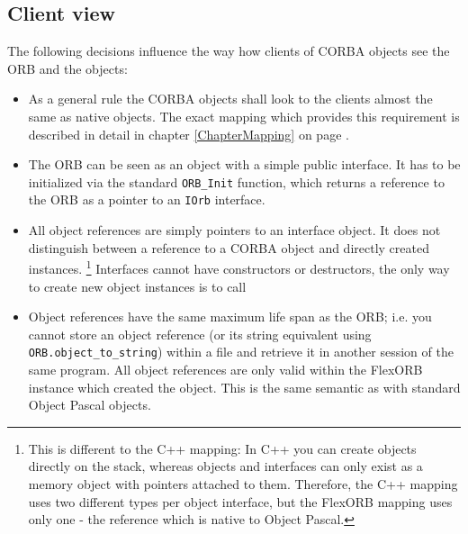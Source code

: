 \documentclass{report}
\begin{document}
\subsection{Client view}
The following decisions influence the way how clients of CORBA objects see the
ORB and the objects:
\begin{itemize}
\item As a general rule the CORBA objects shall look to the clients almost
      the same as native objects. The exact mapping which provides this
      requirement is described in detail in chapter \ref{ChapterMapping} on
      page \pageref{ChapterMapping}.
\item The ORB can be seen as an object with a simple public interface. It has to
      be initialized via the standard \texttt{ORB\_Init} function, which
      returns a reference to the ORB as a pointer to an \texttt{IOrb} interface.
\item All object references are simply pointers to an interface
      object. It does not distinguish between a reference to a CORBA object and
      directly created instances.
      \footnote{This is different to the C++ mapping: In C++ you can create
      objects directly on the stack, whereas \fpc objects and interfaces
      can only exist as a memory object with pointers attached to them.
      Therefore, the C++ mapping uses two different types per object interface,
      but the FlexORB mapping uses only one - the reference which is native to
      Object Pascal.}
      Interfaces cannot have constructors or destructors, the only way to
      create new object instances is to call 
\item Object references have the same maximum life span as the ORB; i.e. you
      cannot store an object reference (or its string equivalent using
      \texttt{ORB.object\_to\_string}) within a file and retrieve it in
      another session of the same program. All object references are only valid
      within the FlexORB instance which created the object.
      \newline This is the same semantic as with standard Object Pascal objects.
\end{itemize}
\end{document}
